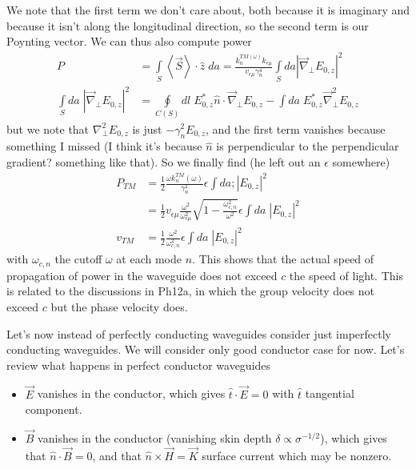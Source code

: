\documentclass[10pt]{report}
\newcommand{\expvalue}[1]{\left<#1\right>}
\newcommand{\abs}[1]{\left|#1\right|}
\begin{document}
We note that the first term we don't care about, both because it is imaginary and because it isn't along the longitudinal direction, so the second term is our Poynting vector. We can thus also compute power
\begin{align}
    P &= \int\limits_{S}^{}\expvalue{\vec{S}}\cdot \hat{z}\;da = \frac{k_n^{TM(\omega)}k_{\epsilon \mu}}{v_{\epsilon \mu}\gamma_n^4}\int\limits_{S}^{}da\abs{\vec{\nabla}_{\perp}E_{0,z}}^2\\
    \int\limits_{S}^{}da\;\abs{\vec{\nabla}_{\perp}E_{0,z}}^2 &= \oint\limits_{C(S)} dl \;E^*_{0,z} \hat{n} \cdot \vec{\nabla}_{\perp}E_{0,z} - \int da\; E_{0,z}^* \vec{\nabla}_{\perp}^2E_{0,z}
\end{align}
but we note that $\nabla_\perp^2 E_{0,z}$ is just $-\gamma_n^2 E_{0,z}$, and the first term vanishes because something I missed (I think it's because $\hat{n}$ is perpendicular to the perpendicular gradient? something like that). So we finally find (he left out an $\epsilon$ somewhere)
\begin{align}
    P_{TM} &= \frac{1}{2}\frac{\omega k_n^{TM}(\omega)}{\gamma_n^2} \epsilon \int da; \abs{E_{0,z}}^2\\
    &= \frac{1}{2}v_{\epsilon \mu}\frac{\omega^2}{\omega_{\epsilon \mu}^2}\sqrt{1 - \frac{\omega_{c,n}^2}{\omega^2}}\epsilon \int da\; \abs{E_{0,z}}^2\\
    v_{TM} &= \frac{1}{2}\frac{\omega^2}{\omega_{c,n}^2}\epsilon \int da\; \abs{E_{0,z}}^2
\end{align}
with $\omega_{c,n}$ the cutoff $\omega$ at each mode $n$. This shows that the actual speed of propagation of power in the waveguide does not exceed $c$ the speed of light. This is related to the discussions in Ph12a, in which the group velocity does not exceed $c$ but the phase velocity does. 

Let's now instead of perfectly conducting waveguides consider just imperfectly conducting waveguides. We will consider only good conductor case for now. Let's review what happens in perfect conductor waveguides
\begin{itemize}
    \item $\vec{E}$ vanishes in the conductor, which gives $\hat{t} \cdot \vec{E} = 0$ with $\hat{t}$ tangential component.
    \item $\vec{B}$ vanishes in the conductor (vanishing skin depth $\delta \propto \sigma^{-1/2}$), which gives that $\hat{n} \cdot \vec{B} = 0$, and that $\hat{n} \times \vec{H} = \vec{K}$ surface current which may be nonzero.
\end{itemize}
\end{document}

